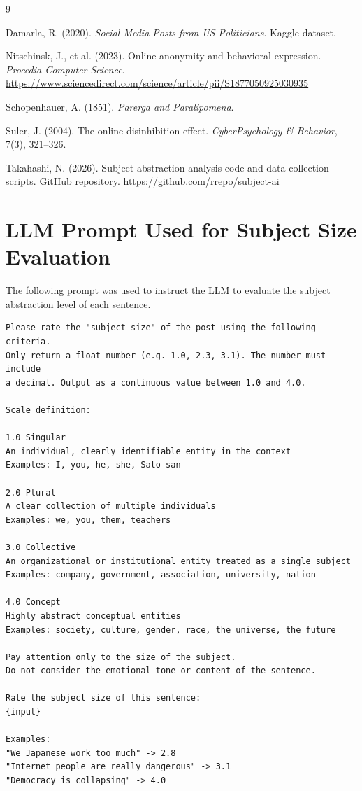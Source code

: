 \documentclass{article}
\begin{document}
\begin{thebibliography}{9}

Damarla, R. (2020).
\textit{Social Media Posts from US Politicians}.
Kaggle dataset.

Nitschinsk, J., et al. (2023).
Online anonymity and behavioral expression.
\textit{Procedia Computer Science}.
\url{https://www.sciencedirect.com/science/article/pii/S1877050925030935}

Schopenhauer, A. (1851).
\textit{Parerga and Paralipomena}.

Suler, J. (2004).
The online disinhibition effect.
\textit{CyberPsychology \& Behavior}, 7(3), 321--326.

Takahashi, N. (2026).
Subject abstraction analysis code and data collection scripts.
GitHub repository.
\url{https://github.com/rrepo/subject-ai}

\end{thebibliography}

\appendix

\section{LLM Prompt Used for Subject Size Evaluation}

The following prompt was used to instruct the LLM to evaluate the
subject abstraction level of each sentence.

\begin{verbatim}
Please rate the "subject size" of the post using the following criteria.
Only return a float number (e.g. 1.0, 2.3, 3.1). The number must include
a decimal. Output as a continuous value between 1.0 and 4.0.

Scale definition:

1.0 Singular
An individual, clearly identifiable entity in the context
Examples: I, you, he, she, Sato-san

2.0 Plural
A clear collection of multiple individuals
Examples: we, you, them, teachers

3.0 Collective
An organizational or institutional entity treated as a single subject
Examples: company, government, association, university, nation

4.0 Concept
Highly abstract conceptual entities
Examples: society, culture, gender, race, the universe, the future

Pay attention only to the size of the subject.
Do not consider the emotional tone or content of the sentence.

Rate the subject size of this sentence:
{input}

Examples:
"We Japanese work too much" -> 2.8
"Internet people are really dangerous" -> 3.1
"Democracy is collapsing" -> 4.0
\end{verbatim}
\end{document}
